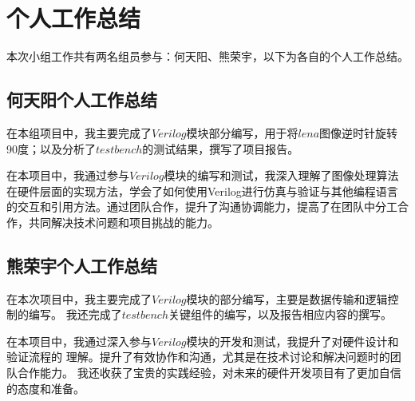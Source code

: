 \documentclass[12pt, a4paper]{article}
\begin{document}
\section{个人工作总结}
本次小组工作共有两名组员参与：何天阳、熊荣宇，以下为各自的个人工作总结。

\subsection{何天阳个人工作总结}

在本组项目中，我主要完成了$Verilog$模块部分编写，用于将$lena$图像逆时针旋转90度；以及分析了$testbench$的测试结果，撰写了项目报告。

在本项目中，我通过参与$Verilog$模块的编写和测试，我深入理解了图像处理算法在硬件层面的实现方法，学会了如何使用Verilog进行仿真与验证与其他编程语言的交互和引用方法。通过团队合作，提升了沟通协调能力，提高了在团队中分工合作，共同解决技术问题和项目挑战的能力。

\subsection{熊荣宇个人工作总结}

在本次项目中，我主要完成了$Verilog$模块的部分编写，主要是数据传输和逻辑控制的编写。
我还完成了$testbench$关键组件的编写，以及报告相应内容的撰写。

在本项目中，我通过深入参与$Verilog$模块的开发和测试，我提升了对硬件设计和验证流程的
理解。提升了有效协作和沟通，尤其是在技术讨论和解决问题时的团队合作能力。
我还收获了宝贵的实践经验，对未来的硬件开发项目有了更加自信的态度和准备。
\end{document}
